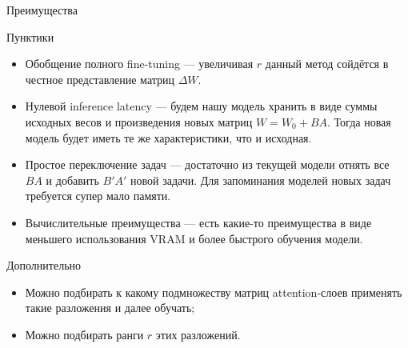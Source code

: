 \documentclass[9pt]{beamer}
\begin{document}
\begin{frame}{Преимущества}

    \begin{block}{Пунктики}
        \begin{itemize}
            \item Обобщение полного fine-tuning --- увеличивая $r$ данный метод сойдётся в честное представление матриц $\Delta W$.
            \item Нулевой inference latency --- будем нашу модель хранить в виде суммы исходных весов и произведения новых матриц $W = W_0 + B A$. Тогда новая модель будет иметь те же характеристики, что и исходная.
            \item Простое переключение задач --- достаточно из текущей модели отнять все $B A$ и добавить $B' A'$ новой задачи. Для запоминания моделей новых задач требуется супер мало памяти.
            \item Вычислительные преимущества --- есть какие-то преимущества в виде меньшего использования VRAM и более быстрого обучения модели.
        \end{itemize}
    \end{block}

    \begin{block}{Дополнительно}
        \begin{itemize}
            \item Можно подбирать к какому подмножеству матриц attention-слоев применять такие разложения и далее обучать;
            \item Можно подбирать ранги $r$ этих разложений.
        \end{itemize}
    \end{block}

\end{frame}
\end{document}
